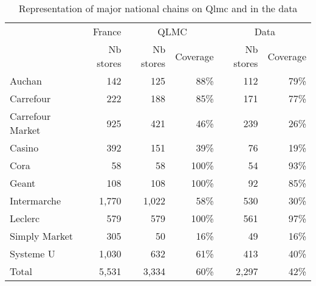 \documentclass[english]{article}
\begin{document}
\begin{table}[htbp]
\caption{Representation of major national chains on Qlmc and in the data}
\label{tab:qlmc_chain_repr}
\begin{threeparttable}
\begin{tabular}{lr|rr|rr}
\toprule
\toprule
          & France & \multicolumn{2}{c|}{QLMC} & \multicolumn{2}{c}{Data} \\
          & Nb stores & Nb stores & Coverage & Nb stores & Coverage \\
\midrule
    Auchan & 142   & 125   & 88\%  & 112   & 79\% \\
    Carrefour & 222   & 188   & 85\%  & 171   & 77\% \\
    Carrefour Market & 925   & 421   & 46\%  & 239   & 26\% \\
    Casino & 392   & 151   & 39\%  & 76    & 19\% \\
    Cora  & 58    & 58    & 100\% & 54    & 93\% \\
    Geant & 108   & 108   & 100\% & 92    & 85\% \\
    Intermarche & 1,770 & 1,022 & 58\%  & 530   & 30\% \\
    Leclerc & 579   & 579   & 100\% & 561   & 97\% \\
    Simply Market & 305   & 50    & 16\%  & 49    & 16\% \\
    Systeme U & 1,030 & 632   & 61\%  & 413   & 40\% \\
\midrule		
    Total & 5,531 & 3,334 & 60\%  & 2,297 & 42\% \\
\bottomrule
\bottomrule
\end{tabular}
\end{threeparttable}
\end{table}
\end{document}
